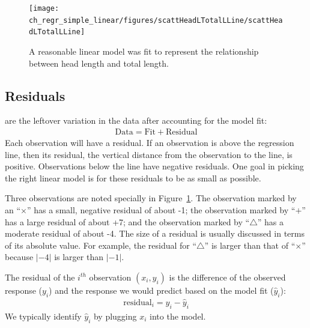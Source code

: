 \begin{figure}
   \centering
   \texttt{[image: ch\_regr\_simple\_linear/figures/scattHeadLTotalLLine/scattHeadLTotalLLine]}
   \caption{A reasonable linear model was fit to represent the relationship between head length and total length.}
   \label{scattHeadLTotalLLine}
\end{figure}

\subsection{Residuals}


 are the leftover variation in the data after accounting for the model fit:
\begin{align*}
\text{Data} = \text{Fit} + \text{Residual}
\end{align*}
Each observation will have a residual. If an observation is above the regression line, then its residual, the vertical distance from the observation to the line, is positive. Observations below the line have negative residuals. One goal in picking the right linear model is for these residuals to be as small as possible.

Three observations are noted specially in Figure~\ref{scattHeadLTotalLLine}. The observation marked by an ``$\times$'' has a small, negative residual of about -1; the observation marked by ``$+$'' has a large residual of about +7; and the observation marked by ``$\triangle$'' has a moderate residual of about -4. The size of a residual is usually discussed in terms of its absolute value. For example, the residual for ``$\triangle$'' is larger than that of ``$\times$'' because $|-4|$ is larger than $|-1|$.


\begin{termBox}{
The residual of the $i^{th}$ observation $(x_i, y_i)$ is the difference of the observed response ($y_i$) and the response we would predict based on the model fit ($\hat{y}_i$):
\begin{eqnarray*}
\text{residual}_i = y_i - \hat{y}_i
\end{eqnarray*}
We typically identify $\hat{y}_i$ by plugging $x_i$ into the model.}
\end{termBox}

